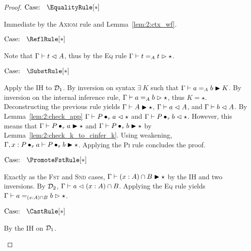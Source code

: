 \begin{proof}
    $\text{Case: }\begin{array}{c} \EqualityRule[*] \end{array}$
    \begin{proofcase}
        Immediate by the \textsc{Axiom} rule and Lemma~\ref{lem:2:ctx_wf}.
    \end{proofcase}

    $\text{Case: }\begin{array}{c} \ReflRule[*] \end{array}$
    \begin{proofcase}
        Note that $\Gamma \vdash t \vartriangleleft A$, thus by the \textsc{Eq} rule $\Gamma \vdash t =_A t \vartriangleright \star$.
    \end{proofcase}

    $\text{Case: }\begin{array}{c} \SubstRule[*] \end{array}$
    \begin{proofcase}
        Apply the IH to $\mathcal{D}_{1}$.
        By inversion on syntax $\exists\ K$ such that $\Gamma \vdash a =_A b \blacktriangleright K$.
        By inversion on the internal inference rule, $\Gamma \vdash a =_A b \vartriangleright \star$, thus $K = \star$.
        Deconstructing the previous rule yields $\Gamma \vdash A \blacktriangleright \star$, $\Gamma \vdash a \vartriangleleft A$, and $\Gamma \vdash b \vartriangleleft A$.
        By Lemma~\ref{lem:2:check_app} $\Gamma \vdash P \bullet_{\tau} a \vartriangleleft \star$ and $\Gamma \vdash P \bullet_{\tau} b \vartriangleleft \star$.
        However, this means that $\Gamma \vdash P \bullet_{\tau} a \blacktriangleright \star$ and $\Gamma \vdash P \bullet_{\tau} b \blacktriangleright \star$ by Lemma~\ref{lem:2:check_k_to_cinfer_k}.
        Using weakening, $\Gamma, x : P \bullet_{\tau} a \vdash P \bullet_{\tau} b \blacktriangleright \star$.
        Applying the \textsc{Pi} rule concludes the proof.
    \end{proofcase}

    $\text{Case: }\begin{array}{c} \PromoteFstRule[*] \end{array}$
    \begin{proofcase}
        Exactly as the \textsc{Fst} and \textsc{Snd} cases, $\Gamma \vdash (x : A) \cap B \blacktriangleright \star$ by the IH and two inversions.
        By $\mathcal{D}_{2}$, $\Gamma \vdash a \vartriangleleft (x : A) \cap B$.
        Applying the \textsc{Eq} rule yields $\Gamma \vdash a =_{(x : A) \cap B} b \vartriangleright \star$.
    \end{proofcase}

    $\text{Case: }\begin{array}{c} \CastRule[*] \end{array}$
    \begin{proofcase}
        By the IH on $\mathcal{D}_{1}$.
    \end{proofcase}


\end{proof}
